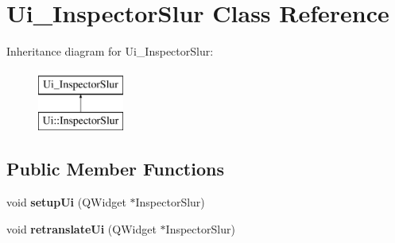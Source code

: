 \hypertarget{class_ui___inspector_slur}{}\section{Ui\+\_\+\+Inspector\+Slur Class Reference}
\label{class_ui___inspector_slur}
Inheritance diagram for Ui\+\_\+\+Inspector\+Slur\+:\begin{figure}[H]
\begin{center}
\leavevmode
\includegraphics[height=2.000000cm]{class_ui___inspector_slur}
\end{center}
\end{figure}
\subsection*{Public Member Functions}
\begin{DoxyCompactItemize}
\item 
\mbox{\label{class_ui___inspector_slur_ac55079e7a575f11fb0bf9f6a6029a570}} 
void {\bfseries setup\+Ui} (Q\+Widget $\ast$Inspector\+Slur)
\item 
\mbox{\label{class_ui___inspector_slur_a34f6037ee9b540393577b8f54dd54289}} 
void {\bfseries retranslate\+Ui} (Q\+Widget $\ast$Inspector\+Slur)
\end{DoxyCompactItemize}
